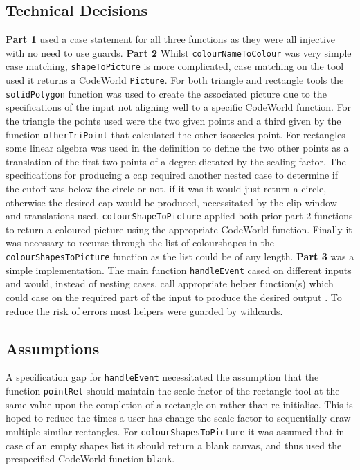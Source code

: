 \documentclass[11pt]{article}
\begin{document}
\subsection{Technical Decisions}
\textbf{Part 1} used a case statement for all three functions as they were all  injective with no need to use guards.
 \textbf{Part 2} Whilst \verb|colourNameToColour| was  very simple case matching, \verb|shapeToPicture| is more complicated, case matching on the tool used it returns a CodeWorld \verb|Picture|. For both triangle and rectangle tools the \verb|solidPolygon| function was used to create the associated picture due to the specifications of the input not aligning well to a specific CodeWorld function. For the triangle the points used were the two given points and a third given by the function \verb|otherTriPoint| that calculated the other isosceles point. For rectangles some linear algebra was used in the definition to define the two other points as a translation of the first two points of a degree dictated by the scaling factor. The specifications for producing a cap required another nested case to determine if the cutoff was below the circle or not. if it was it would just return a circle, otherwise the desired cap would be produced, necessitated by the clip window and translations used. \verb|colourShapeToPicture| applied both prior part 2 functions to return a coloured picture using the appropriate CodeWorld function. Finally it was necessary to recurse through the list of colourshapes in the \verb|colourShapesToPicture| function as the list could be of any length.
 \textbf{Part 3} was a simple implementation. The main function \verb|handleEvent| cased on different inputs and would, instead of nesting cases, call appropriate helper function(s) which could case on the required part of the input to produce the desired output .  To reduce the risk of errors most helpers were guarded by wildcards.

 \subsection{Assumptions}%
A specification gap for \verb|handleEvent| necessitated the assumption that the function \verb|pointRel| should maintain the scale factor of the rectangle tool at the same value upon the completion of a rectangle on rather than re-initialise. This is hoped to reduce the times a user has change the scale factor to sequentially draw multiple similar rectangles. For \verb|colourShapesToPicture| it was assumed that in case of an empty shapes list it should return a blank canvas, and thus used the prespecified CodeWorld function \verb|blank|.
\end{document}
